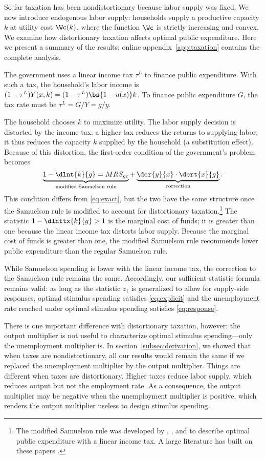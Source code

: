 \documentclass[letterpaper,12pt,leqno]{article}
\begin{document}
\begin{bibunit}
So far taxation has been nondistortionary because labor supply was fixed. We now introduce endogenous labor supply: households supply a productive capacity $k$ at utility cost $\Wc(k)$, where the function $\Wc$ is strictly increasing and convex. We examine how distortionary taxation affects optimal public expenditure. Here we present a summary of the results; online appendix~\ref{app:taxation} contains the complete analysis.

The government uses a linear income tax $\tau^{L}$ to finance public expenditure. With such a tax, the household's labor income is $(1-\tau^{L})  Y(x,k)=(1-\tau^{L}) \bs{1-u(x)}  k$. To finance public expenditure $G$, the tax rate must be $\tau^{L}=G/Y=g/y$. 

The household chooses $k$ to maximize utility. The labor supply decision is distorted by the income tax: a higher tax reduces the returns to supplying labor; it thus reduces the capacity $k$ supplied by the household (a substitution effect). Because of this distortion, the first-order condition of the government's problem becomes
\begin{equation*}
\underbrace{1-\dlnt{k}{g}=MRS_{gc}}_{\text{modified Samuelson rule}} + \underbrace{\der{y}{x}\cdot \dert{x}{g}}_{\text{correction}}.
\end{equation*}
This condition differs from \eqref{eq:exact}, but the two have the same structure once the Samuelson rule is modified to account for distortionary taxation.\footnote{The modified Samuelson rule was developed by , , and  to describe optimal public expenditure with a linear income tax. A large literature has built on these papers .} The statistic $1-\dlnttx{k}{g}>1$ is the marginal cost of funds; it is greater than one because the linear income tax distorts labor supply. Because the marginal cost of funds is greater than one, the modified Samuelson rule recommends lower public expenditure than the regular Samuelson rule.

While Samuelson spending is lower with the linear income tax, the correction to the Samuelson rule remains the same. Accordingly, our sufficient-statistic formula remains valid: as long as the statistic $z_1$ is generalized to allow for supply-side responses, optimal stimulus spending satisfies \eqref{eq:explicit} and the unemployment rate reached under optimal stimulus spending satisfies \eqref{eq:response}.

There is one important difference with distortionary taxation, however: the output multiplier is not useful to characterize optimal stimulus spending---only the unemployment multiplier is. In section~\ref{subsec:derivation}, we showed that when taxes are nondistortionary, all our results would remain the same if we replaced the unemployment multiplier by the output multiplier. Things are different when taxes are distortionary. Higher taxes reduce labor supply, which reduces output but not the employment rate. As a consequence, the output multiplier may be negative when the unemployment multiplier is positive, which renders the output multiplier useless to design stimulus spending.


\end{bibunit}
\end{document}
